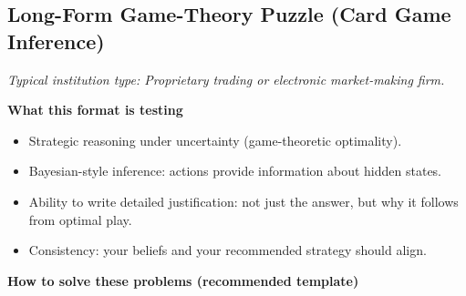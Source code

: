 \documentclass[11pt,letterpaper,openany]{book}
\newcommand{\RoleProfile}[2]{%
  \subsection{#1}%
  \noindent\textit{Typical institution type: #2.}\par
}
\begin{document}
\RoleProfile{Long-Form Game-Theory Puzzle (Card Game Inference)}{Proprietary trading or electronic market-making firm}
\textbf{What this format is testing}
\begin{itemize}
  \item Strategic reasoning under uncertainty (game-theoretic optimality).
  \item Bayesian-style inference: actions provide information about hidden states.
  \item Ability to write detailed justification: not just the answer, but why it follows from optimal play.
  \item Consistency: your beliefs and your recommended strategy should align.
\end{itemize}

\textbf{How to solve these problems (recommended template)}
\end{document}
